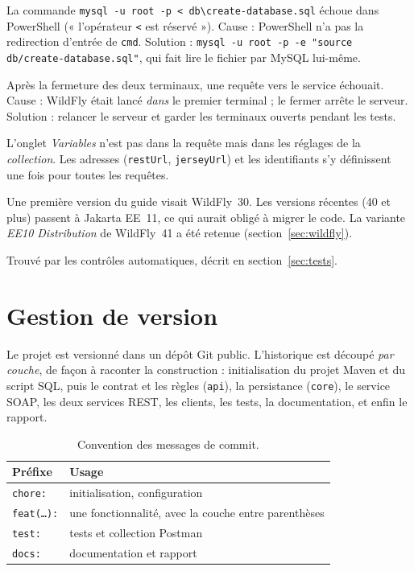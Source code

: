 \documentclass[11pt,a4paper]{article}
\newcommand{\code}[1]{\texttt{#1}}
\begin{document}
\begin{description}[leftmargin=0pt,labelsep=0.6em,style=nextline]
  \item[Redirection \code{<} refusée par PowerShell.] La commande \code{mysql -u root -p < db\textbackslash create-database.sql} échoue dans PowerShell (« l'opérateur \code{<} est réservé »). Cause : PowerShell n'a pas la redirection d'entrée de \code{cmd}. Solution : \code{mysql -u root -p -e "source db/create-database.sql"}, qui fait lire le fichier par MySQL lui-même.
  \item[« Unable to connect to the remote server ».] Après la fermeture des deux terminaux, une requête vers le service échouait. Cause : WildFly était lancé \emph{dans} le premier terminal ; le fermer arrête le serveur. Solution : relancer le serveur et garder les terminaux ouverts pendant les tests.
  \item[Variables Postman introuvables.] L'onglet \emph{Variables} n'est pas dans la requête mais dans les réglages de la \emph{collection}. Les adresses (\code{restUrl}, \code{jerseyUrl}) et les identifiants s'y définissent une fois pour toutes les requêtes.
  \item[Choix de la version de WildFly.] Une première version du guide visait WildFly~30. Les versions récentes (40 et plus) passent à Jakarta EE~11, ce qui aurait obligé à migrer le code. La variante \emph{EE10 Distribution} de WildFly~41 a été retenue (section~\ref{sec:wildfly}).
  \item[Défaut du JWT.] Trouvé par les contrôles automatiques, décrit en section~\ref{sec:tests}.
\end{description}

\section{Gestion de version}
Le projet est versionné dans un dépôt Git public. L'historique est découpé \emph{par couche}, de façon à raconter la construction : initialisation du projet Maven et du script SQL, puis le contrat et les règles (\code{api}), la persistance (\code{core}), le service SOAP, les deux services REST, les clients, les tests, la documentation, et enfin le rapport.

\begin{table}[H]
\centering
\small
\begin{tabular}{@{}ll@{}}
\toprule
\textbf{Préfixe} & \textbf{Usage}\\
\midrule
\code{chore:} & initialisation, configuration\\
\code{feat(\ldots):} & une fonctionnalité, avec la couche entre parenthèses\\
\code{test:} & tests et collection Postman\\
\code{docs:} & documentation et rapport\\
\bottomrule
\end{tabular}
\caption{Convention des messages de commit.}
\end{table}
\end{document}
